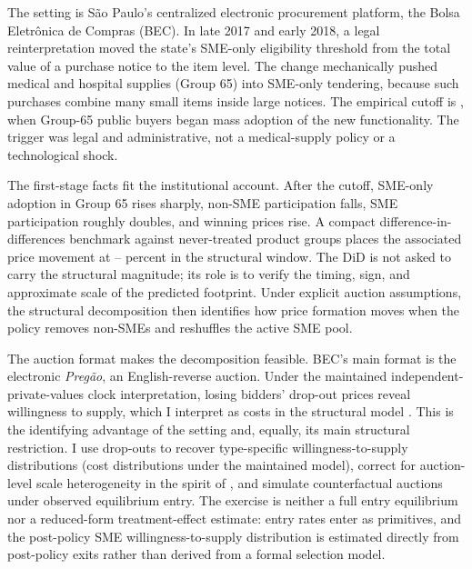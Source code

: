 The setting is S\~ao Paulo's centralized electronic procurement platform,
the Bolsa Eletr\^onica de Compras (BEC). In late 2017 and early 2018, a
legal reinterpretation moved the state's SME-only eligibility threshold from
the total value of a purchase notice to the item level. The change
mechanically pushed medical and hospital supplies (Group 65) into SME-only
tendering, because such purchases combine many small items inside large
notices. The empirical cutoff is \policyCutoffMonth{}, when Group-65 public
buyers began mass adoption of the new functionality. The trigger was legal
and administrative, not a medical-supply policy or a technological shock.

The first-stage facts fit the institutional account. After the cutoff,
SME-only adoption in Group 65 rises sharply, non-SME participation falls,
SME participation roughly doubles, and winning prices rise. A compact
difference-in-differences benchmark against \controlGroupCount{}
never-treated product groups places the associated price movement at
\didLowerPct--\didUpperPct{} percent in the structural window. The DiD is
not asked to carry the structural magnitude; its role is to verify the
timing, sign, and approximate scale of the predicted footprint. Under
explicit auction assumptions, the structural decomposition then
identifies how price formation moves when the policy removes non-SMEs
and reshuffles the active SME pool.

The auction format makes the decomposition feasible. BEC's main format is
the electronic \emph{Preg\~ao}, an English-reverse auction. Under the
maintained independent-private-values clock interpretation, losing bidders'
drop-out prices reveal willingness to supply, which I interpret as costs in
the structural model \citep{haile2003}. This is the identifying advantage
of the setting and, equally, its main structural restriction. I use drop-outs to recover
type-specific willingness-to-supply distributions (cost distributions under
the maintained model), correct for auction-level scale heterogeneity in the
spirit of \citet{krasnokutskaya2011}, and simulate counterfactual auctions
under observed equilibrium entry. The exercise is neither a full entry
equilibrium nor a reduced-form treatment-effect estimate: entry rates enter
as primitives, and the post-policy SME willingness-to-supply distribution is
estimated directly from post-policy exits rather than derived from a formal
selection model.

